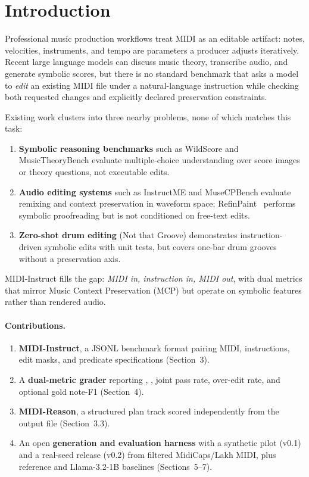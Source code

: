 \section{Introduction}

Professional music production workflows treat MIDI as an editable artifact: notes, velocities, instruments, and tempo are parameters a producer adjusts iteratively. Recent large language models can discuss music theory, transcribe audio, and generate symbolic scores, but there is no standard benchmark that asks a model to \emph{edit} an existing MIDI file under a natural-language instruction while checking both requested changes and explicitly declared preservation constraints.

Existing work clusters into three nearby problems, none of which matches this task:
\begin{enumerate}[leftmargin=*]
\item \textbf{Symbolic reasoning benchmarks} such as WildScore and MusicTheoryBench evaluate multiple-choice understanding over score images or theory questions, not executable edits.
\item \textbf{Audio editing systems} such as InstructME and MuseCPBench evaluate remixing and context preservation in waveform space; RefinPaint~\cite{ramoneda2024refinpaint} performs symbolic proofreading but is not conditioned on free-text edits.
\item \textbf{Zero-shot drum editing} (Not that Groove) demonstrates instruction-driven symbolic edits with unit tests, but covers one-bar drum grooves without a preservation axis.
\end{enumerate}

MIDI-Instruct fills the gap: \emph{MIDI in, instruction in, MIDI out}, with dual metrics that mirror Music Context Preservation (MCP) but operate on symbolic features rather than rendered audio.

\paragraph{Contributions.}
\begin{enumerate}[leftmargin=*]
\item \textbf{MIDI-Instruct}, a JSONL benchmark format pairing MIDI, instructions, edit masks, and predicate specifications (Section~3).
\item A \textbf{dual-metric grader} reporting \edit{}, \preserve{}, joint pass rate, over-edit rate, and optional gold note-F1 (Section~4).
\item \textbf{MIDI-Reason}, a structured plan track scored independently from the output file (Section~3.3).
\item An open \textbf{generation and evaluation harness} with a synthetic pilot (v0.1) and a real-seed release (v0.2) from filtered MidiCaps/Lakh MIDI, plus reference and Llama-3.2-1B baselines (Sections~5--7).
\end{enumerate}

